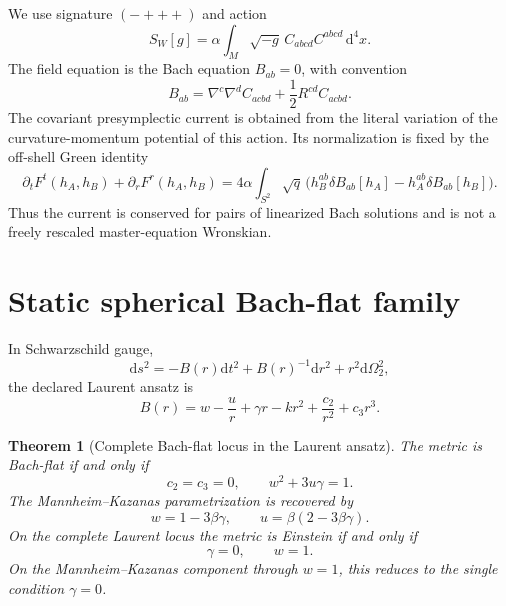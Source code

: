 \documentclass[11pt]{article}
\newtheorem{theorem}{Theorem}[section]
\theoremstyle{definition}
\theoremstyle{remark}
\newcommand{\dd}{\mathrm d}
\begin{document}
We use signature \((-+++)\) and action
\begin{equation}
 S_W[g]=\alpha\int_M\sqrt{-g}\,C_{abcd}C^{abcd}\,\dd^4x.
\end{equation}
The field equation is the Bach equation \(B_{ab}=0\), with convention
\begin{equation}
 B_{ab}=\nabla^c\nabla^dC_{acbd}
       +\frac12R^{cd}C_{acbd}.
\end{equation}
The covariant presymplectic current is obtained from the literal variation
of the curvature-momentum potential of this action.  Its normalization is
fixed by the off-shell Green identity
\begin{equation}\label{eq:green-identity}
 \partial_tF^t(h_A,h_B)+\partial_rF^r(h_A,h_B)
 =4\alpha\int_{S^2}\sqrt{q}\,
 \bigl(h_B^{ab}\delta B_{ab}[h_A]
      -h_A^{ab}\delta B_{ab}[h_B]\bigr).
\end{equation}
Thus the current is conserved for pairs of linearized Bach solutions and is
not a freely rescaled master-equation Wronskian.

\section{Static spherical Bach-flat family}

In Schwarzschild gauge,
\begin{equation}
 \dd s^2=-B(r)\dd t^2+B(r)^{-1}\dd r^2+r^2\dd\Omega_2^2,
\end{equation}
the declared Laurent ansatz is
\begin{equation}
 B(r)=w-\frac{u}{r}+\gamma r-kr^2+\frac{c_2}{r^2}+c_3r^3.
\end{equation}

\begin{theorem}[Complete Bach-flat locus in the Laurent ansatz]
The metric is Bach-flat if and only if
\begin{equation}
 c_2=c_3=0,
 \qquad
 w^2+3u\gamma=1.
\end{equation}
The Mannheim--Kazanas parametrization is recovered by
\[
 w=1-3\beta\gamma,\qquad
 u=\beta(2-3\beta\gamma).
\]
On the complete Laurent locus the metric is Einstein if and only if
\begin{equation}\label{eq:einstein-static-locus}
 \gamma=0,\qquad w=1.
\end{equation}
On the Mannheim--Kazanas component through \(w=1\), this reduces to the
single condition \(\gamma=0\).
\end{theorem}
\end{document}
